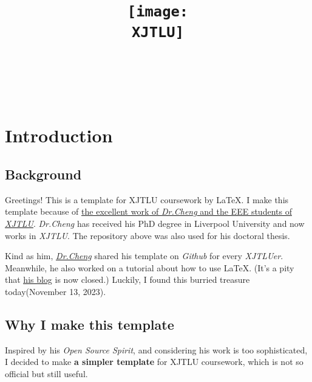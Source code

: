 \documentclass{article}
\title{
    \texttt{[image: \\XJTLU]}\\
    \vspace{1cm}
    \moculeCode\ \moduleName
    }
\author{
    \authorName \\
    \authorID
    }
\date{\reportDate}
\begin{document}


\maketitle

\vspace{1cm}

\newpage
\tableofcontents

\newpage
\section{Introduction}
\subsection{Background}
Greetings! This is a template for XJTLU coursework by \LaTeX. \cite{example1}
I make this template because of \href{https://github.com/feimax/latex_template_for_xjtlu_eee_light}{\underline{the excellent work} of \textit{Dr.Cheng} and the EEE students of \textit{XJTLU}}. 
\textit{Dr.Cheng} has received his PhD degree in Liverpool University and now works in \textit{XJTLU}.\cite{example2} 
The repository above was also used for his doctoral thesis.\par
Kind as him, \href{https://www.xjtlu.edu.cn/en/study/departments/school-of-advanced-technology/communications-and-networking/department-staff/academic-staff/staff/fei-cheng}{\textit{\underline{Dr.Cheng}}} shared his template on \textit{Github} for every \textit{XJTLUer}. 
Meanwhile, he also worked on a tutorial about how to use \LaTeX. (It's a pity that \href{http://blog.feieee.com/latex}{\underline{his blog}} is now closed.)
Luckily, I found this burried treasure today(November 13, 2023).\par

\subsection{Why I make this template}
Inspired by his \textit{Open Source Spirit}, and considering his work is too sophisticated, I decided to make \textbf{a simpler template} for XJTLU coursework, 
which is not so official but still useful.
\end{document}
